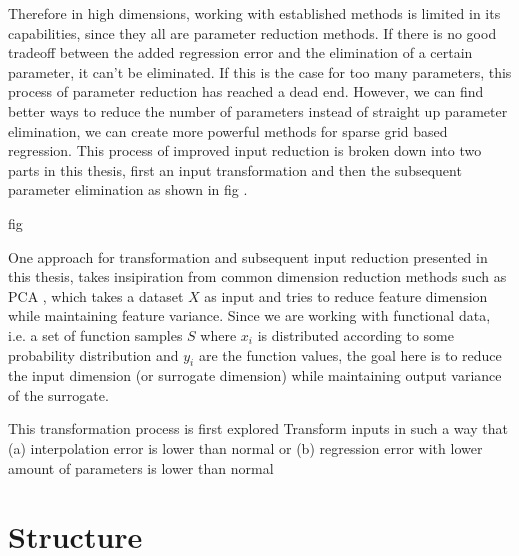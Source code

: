 \documentclass[
  a4paper,  %
  twoside,  %
  bibliography=totoc,
  headsepline,
  cleardoublepage=empty,
  parskip=half,
  draft=false
]{scrbook}
\begin{document}
Therefore in high dimensions, working with established methods is limited in its capabilities, since they all are parameter reduction methods.
If there is no good tradeoff between the added regression error and the elimination of a certain parameter, it can't be eliminated. If this is the case for too many parameters, this process of parameter reduction has reached a dead end.
However, we can find better ways to reduce the number of parameters instead of straight up parameter elimination, we can create more powerful methods for sparse grid based regression.
This process of improved input reduction is broken down into two parts in this thesis, first an input transformation and then the subsequent parameter elimination as shown in fig .

fig

One approach for transformation and subsequent input reduction presented in this thesis, takes insipiration from common dimension reduction methods such as PCA , which takes a dataset $X$ as input and tries to reduce feature dimension while maintaining feature variance.
Since we are working with functional data, i.e. a set of function samples $S$ where $x_i$ is distributed according to some probability distribution and $y_i$ are the function values, the goal here is to reduce the input dimension (or surrogate dimension) while maintaining output variance of the surrogate.


This transformation process is first explored Transform inputs in such a way that (a) interpolation error is lower than normal or (b) regression error with lower amount of parameters is lower than normal
 

\section{Structure}
\end{document}
